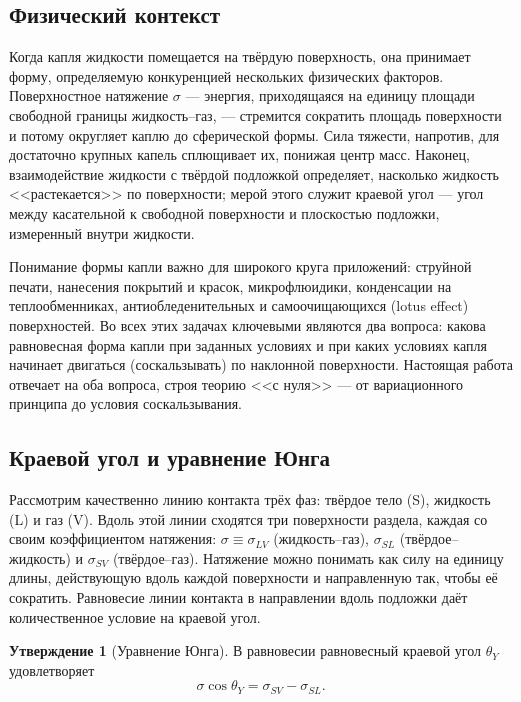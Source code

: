 \documentclass[11pt]{article}
\newcommand{\thY}{\theta_{Y}}
\theoremstyle{definition}
\newtheorem{statement}{Утверждение}
\begin{document}
\subsection{Физический контекст}
Когда капля жидкости помещается на твёрдую поверхность, она принимает форму,
определяемую конкуренцией нескольких физических факторов. Поверхностное натяжение
$\sigma$ --- энергия, приходящаяся на единицу площади свободной границы
жидкость--газ, --- стремится сократить площадь поверхности и потому округляет
каплю до сферической формы. Сила тяжести, напротив, для достаточно крупных капель
сплющивает их, понижая центр масс. Наконец, взаимодействие жидкости с твёрдой
подложкой определяет, насколько жидкость <<растекается>> по поверхности; мерой
этого служит краевой угол --- угол между касательной к свободной поверхности и
плоскостью подложки, измеренный внутри жидкости.

Понимание формы капли важно для широкого круга приложений: струйной печати,
нанесения покрытий и красок, микрофлюидики, конденсации на теплообменниках,
антиобледенительных и самоочищающихся (lotus effect) поверхностей. Во всех этих
задачах ключевыми являются два вопроса: какова равновесная форма капли при
заданных условиях и при каких условиях капля начинает двигаться (соскальзывать)
по наклонной поверхности. Настоящая работа отвечает на оба вопроса, строя теорию
<<с нуля>> --- от вариационного принципа до условия соскальзывания.

\subsection{Краевой угол и уравнение Юнга}
Рассмотрим качественно линию контакта трёх фаз: твёрдое тело (S), жидкость (L) и
газ (V). Вдоль этой линии сходятся три поверхности раздела, каждая со своим
коэффициентом натяжения: $\sigma\equiv\sigma_{LV}$ (жидкость--газ),
$\sigma_{SL}$ (твёрдое--жидкость) и $\sigma_{SV}$ (твёрдое--газ). Натяжение можно
понимать как силу на единицу длины, действующую вдоль каждой поверхности и
направленную так, чтобы её сократить. Равновесие линии контакта в направлении
вдоль подложки даёт количественное условие на краевой угол.

\begin{statement}[Уравнение Юнга]
В равновесии равновесный краевой угол $\thY$ удовлетворяет
\begin{equation}
\sigma\cos\thY=\sigma_{SV}-\sigma_{SL}.
\label{eq:young}
\end{equation}
\end{statement}
\end{document}
